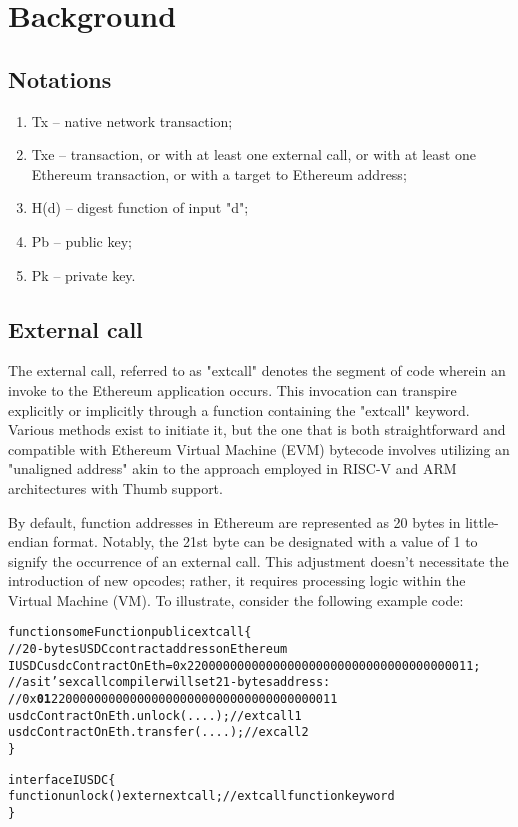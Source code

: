 \section{Background}
\label{section:background}

\renewcommand{\ttdefault}{txtt}

\subsection{Notations} 
\begin{enumerate}
    \item Tx -- native network transaction;
    \item Txe -- transaction, or with at least one external call, 
    or with at least one Ethereum transaction, or with a target to Ethereum address;
    \item H(d) -- digest function of input "d";
    \item Pb -- public key;
    \item Pk -- private key.
\end{enumerate}


\subsection{External call}
The external call, referred to as "extcall" denotes the segment of code wherein 
an invoke to the Ethereum application occurs. This invocation can transpire explicitly 
or implicitly through a function containing the "extcall" keyword. Various methods 
exist to initiate it, but the one that is both straightforward and compatible 
with Ethereum Virtual Machine (EVM) bytecode involves utilizing an "unaligned address" 
akin to the approach employed in RISC-V and ARM architectures with Thumb support. 

By default, function addresses in Ethereum are represented as 20 bytes in little-endian 
format. Notably, the 21st byte can be designated with a value of 1 to signify the occurrence 
of an external call. This adjustment doesn't necessitate the introduction 
of new opcodes; rather, it requires processing logic within the Virtual Machine (VM). 
To illustrate, consider the following example code:

\begin{alltt}
    
function someFunction\(\) public extcall \{
    // 20-bytes USDC contract address on Ethereum
    IUSDC usdcContractOnEth = 0x2200000000000000000000000000000000000011;
    // as it's excall compiler will set 21-bytes address:
    // 0x\textbf{01}2200000000000000000000000000000000000011
    usdcContractOnEth.unlock(....); // extcall 1
    usdcContractOnEth.transfer(....); // excall 2
\}

interface IUSDC \{
    function unlock() extern extcall; // extcall function keyword
\}
\end{alltt}

